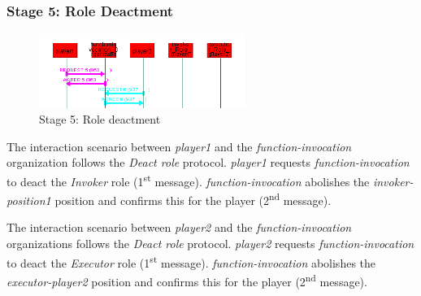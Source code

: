 \subsubsection*{Stage 5: Role Deactment}

\begin{figure}[H]
	\centering
	\includegraphics[width=0.6\textwidth]{images/examples/example1-stage5}
	\caption{Stage 5: Role deactment}
	\label{figure:example1-stage5}
\end{figure} 

The {} interaction scenario between \textit{player1} and the \textit{function-invocation} organization follows the \textit{Deact role} protocol.
\textit{player1} requests \textit{function-invocation} to deact the \textit{Invoker} role (1\textsuperscript{st} message).
\textit{function-invocation} abolishes the \textit{invoker-position1} position and confirms this for the player (2\textsuperscript{nd} message).

The {} interaction scenario between \textit{player2} and the \textit{function-invocation} organizations follows the \textit{Deact role} protocol.
\textit{player2} requests \textit{function-invocation} to deact the \textit{Executor} role (1\textsuperscript{st} message).
\textit{function-invocation} abolishes the \textit{executor-player2} position and confirms this for the player (2\textsuperscript{nd} message).